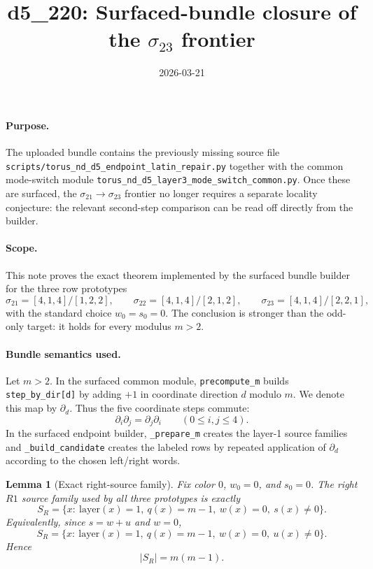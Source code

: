 \documentclass[11pt]{article}
\title{d5\_220: Surfaced-bundle closure of the \(\sigma_{23}\) frontier}
\author{}
\date{2026-03-21}
\newtheorem{lemma}{Lemma}
\theoremstyle{remark}
\newcommand{\stepd}[1]{\partial_{#1}}
\begin{document}
\maketitle

\paragraph{Purpose.}
The uploaded bundle contains the previously missing source file
\texttt{scripts/torus\_nd\_d5\_endpoint\_latin\_repair.py} together with the common mode-switch module
\texttt{torus\_nd\_d5\_layer3\_mode\_switch\_common.py}.  Once these are surfaced, the
\(\sigma_{21}\to\sigma_{23}\) frontier no longer requires a separate locality conjecture: the relevant
second-step comparison can be read off directly from the builder.

\paragraph{Scope.}
This note proves the exact theorem implemented by the surfaced bundle builder for the three row prototypes
\[
\sigma_{21}=[4,1,4]/[1,2,2],\qquad
\sigma_{22}=[4,1,4]/[2,1,2],\qquad
\sigma_{23}=[4,1,4]/[2,2,1],
\]
with the standard choice \(w_0=s_0=0\).  The conclusion is stronger than the odd-only target: it holds for every
modulus \(m>2\).

\paragraph{Bundle semantics used.}
Let \(m>2\).  In the surfaced common module, \texttt{precompute\_m} builds \texttt{step\_by\_dir[d]} by adding
\(+1\) in coordinate direction \(d\) modulo \(m\).  We denote this map by \(\stepd{d}\).
Thus the five coordinate steps commute:
\[
\stepd{i}\stepd{j}=\stepd{j}\stepd{i}\qquad (0\le i,j\le 4).
\]
In the surfaced endpoint builder, \texttt{\_prepare\_m} creates the layer-1 source families and \texttt{\_build\_candidate}
creates the labeled rows by repeated application of \(\stepd{d}\) according to the chosen left/right words.

\begin{lemma}[Exact right-source family]
Fix color \(0\), \(w_0=0\), and \(s_0=0\).  The right \(R1\) source family used by all three prototypes is exactly
\[
S_R=\{x:\ \mathrm{layer}(x)=1,\ q(x)=m-1,\ w(x)=0,\ s(x)\neq 0\}.
\]
Equivalently, since \(s=w+u\) and \(w=0\),
\[
S_R=\{x:\ \mathrm{layer}(x)=1,\ q(x)=m-1,\ w(x)=0,\ u(x)\neq 0\}.
\]
Hence
\[
|S_R|=m(m-1).
\]
\end{lemma}
\end{document}
